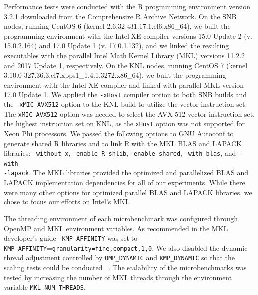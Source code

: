Performance tests were conducted with the R programming environment version 3.2.1
downloaded from the Comprehensive R Archive Network. On the SNB nodes, running CentOS 6
(kernel 2.6.32-431.17.1.el6.x86\_64), we built the programming environment with the Intel
XE compiler versions 15.0 Update 2 (v. 15.0.2.164) and 17.0 Update 1 (v. 17.0.1.132), and
we linked the resulting executables with the parallel Intel Math Kernel Library (MKL)
versions 11.2.2 and 2017 Update 1, respectively. On the KNL nodes, running CentOS 7
(kernel 3.10.0-327.36.3.el7.xpps1\_1.4.1.3272.x86\_64), we built the programming
environment with the Intel XE compiler and linked with parallel MKL version 17.0 Update 1.
We applied the \texttt{-xHost} compiler option to both SNB builds and the
\texttt{-xMIC\_AVX512} option to the KNL build to utilize the
vector instruction set. The \texttt{xMIC-AVX512} option was needed to select the AVX-512
vector instruction set, the highest instruction set on KNL, as the
\texttt{xHost} option was not supported for Xeon Phi processors. We passed the following
options to GNU Autoconf to generate shared R libraries and to link R with the MKL BLAS and
LAPACK libraries: \texttt{--without-x}, \texttt{--enable-R-shlib},
\texttt{--enable-shared}, \texttt{--with-blas}, and \texttt{--with\\-lapack}. The MKL
libraries provided the optimized and parallelized BLAS and LAPACK implementation
dependencies for all of our experiments. While there were many other options for optimized
parallel BLAS and LAPACK libraries, we chose to focus our efforts on Intel's MKL.

The threading environment of each microbenchmark was configured through OpenMP and MKL
environment variables. As recommended in the MKL developer's guide~\cite{intel:mkl2017}
\texttt{KMP\_AFFINITY} was set to \texttt{KMP\_AFFINITY}=\texttt{granularity=fine,compact,1,0}.
We also disabled the dynamic thread adjustment controlled by \texttt{OMP\_DYNAMIC} and
\texttt{KMP\_DYNAMIC} so that the scaling tests could be conducted ~\cite{intel:cpp2015,
intel:cpp2017, intel:mkl11_2, intel:mkl2017}. The scalability of the microbenchmarks was
tested by increasing the number of MKL threads through the environment variable
\texttt{MKL\_NUM\_THREADS}.

